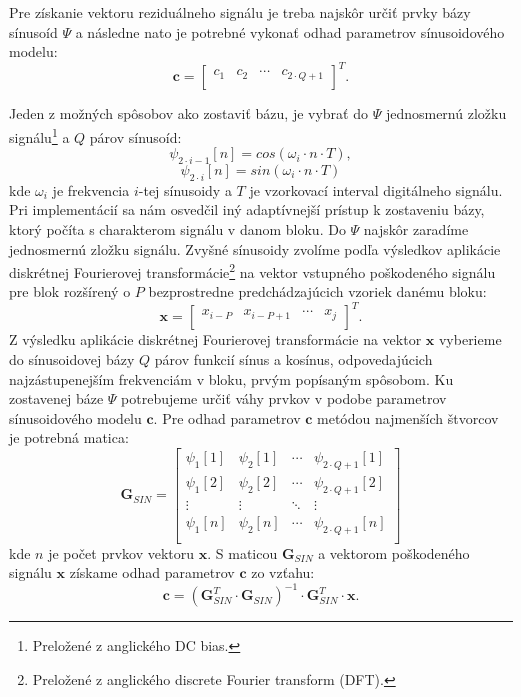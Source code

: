 Pre získanie vektoru reziduálneho signálu je treba najskôr určiť prvky bázy sínusoíd $\Psi$ a následne nato je potrebné vykonať odhad parametrov sínusoidového modelu:
$$\mathbf{c}=\begin{bmatrix} 
  c_1 & c_2 & \cdots & c_{2 \cdot Q  + 1}\\
\end{bmatrix}^T.$$ 

Jeden z možných spôsobov ako zostaviť bázu, je vybrať do $\Psi$ jednosmernú zložku signálu\footnote{Preložené z anglického DC bias.} a $Q$ párov sínusoíd: 
$$\psi_{2 \cdot i - 1}[n]=cos(\omega_i \cdot n \cdot T),$$ 
$$\psi_{2 \cdot i}[n]=sin(\omega_i \cdot n \cdot T)$$
kde $\omega_i$ je frekvencia $i$-tej sínusoidy a $T$ je vzorkovací interval digitálneho signálu. Pri implementácií sa nám osvedčil iný adaptívnejší prístup k zostaveniu bázy, ktorý počíta s charakterom signálu v danom bloku. Do $\Psi$ najskôr zaradíme jednosmernú zložku signálu. Zvyšné sínusoidy zvolíme podľa výsledkov aplikácie diskrétnej Fourierovej transformácie\footnote{Preložené z anglického discrete Fourier transform (DFT).} na vektor vstupného poškodeného signálu pre blok rozšírený o $P$ bezprostredne predchádzajúcich vzoriek danému bloku: 
$$\mathbf{x} =\begin{bmatrix} 
  x_{i-P} & x_{i-P+1} & \cdots & x_{j}\\
\end{bmatrix}^T.$$
Z výsledku aplikácie diskrétnej Fourierovej transformácie na vektor $\mathbf{x}$ vyberieme do sínusoidovej bázy $Q$ párov funkcií sínus a kosínus, odpovedajúcich najzástupenejším frekvenciám v bloku, prvým popísaným spôsobom. Ku zostavenej báze $\Psi$ potrebujeme určiť váhy prvkov v podobe parametrov sínusoidového modelu $\mathbf{c}$. Pre odhad parametrov $\mathbf{c}$ metódou najmenších štvorcov je potrebná matica:
$$\mathbf{G}_{SIN} =\begin{bmatrix} 
  \psi_{1}[1] & \psi_{2}[1] & \cdots & \psi_{2 \cdot Q  + 1}[1]\\
  \psi_{1}[2] & \psi_{2}[2] & \cdots & \psi_{2 \cdot Q  + 1}[2]\\
  \vdots & \vdots & \ddots & \vdots\\
  \psi_{1}[n] & \psi_{2}[n] & \cdots & \psi_{2 \cdot Q  + 1}[n]\\
\end{bmatrix}$$
kde $n$ je počet prvkov vektoru $\mathbf{x}$. S maticou $\mathbf{G}_{SIN}$ a vektorom poškodeného signálu $\mathbf{x}$ získame odhad parametrov $\mathbf{c}$ zo vzťahu:
$$\mathbf{c}=(\mathbf{G}_{SIN}^{T} \cdot \mathbf{G}_{SIN})^{-1} \cdot \mathbf{G}_{SIN}^T \cdot \mathbf{x}.$$ 

